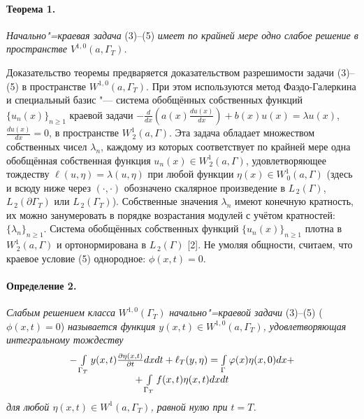 \paragraph{Теорема 1.} \emph{Начально"=краевая задача} (3)--(5) \emph{имеет по крайней мере одно слабое  решение в пространстве $V^{1,0}(a,\Gamma_{T})$.}

Доказательство теоремы предваряется доказательством разрешимости задачи (3)--(5) в пространстве $W^{1,0}(a,\Gamma_{T})$. При этом используются метод Фаэдо-Галеркина и специальный базис "--- система обобщённых собственных функций $\{u_n(x)\}_{n\geqslant 1}$ краевой задачи
$-\frac{d}{dx}\left(a(x)\frac{du(x)}{dx}\right)+b(x)u(x)=\lambda u(x)$, $\frac{du(x)}{dx}=0$,
в пространстве $W^1_{\,2}(a,\Gamma)$. Эта задача обладает множеством собственных чисел $\lambda_n$, каждому из которых соответствует по крайней мере одна обобщённая собственная функция $u_n(x)\in W^1_{\,2}(a,\Gamma)$, удовлетворяющее тождеству $\ell(u,\eta)=\lambda(u,\eta)$
при любой функции $\eta(x)\in W^1_{\,0}(a,\Gamma)$ (здесь и всюду ниже через $\left(\cdot,\cdot\right)$ обозначено скалярное произведение в $L_{\,2}(\Gamma)$, $L_{\,2}(\partial\Gamma_T)$ или $L_{\,2}(\Gamma_T)$). Собственные значения $\lambda_n$  имеют конечную кратность, их можно занумеровать в порядке возрастания модулей с учётом кратностей: $\{\lambda_n\}_{n\geqslant 1}$. Система обобщённых собственных функций $\{u_n(x)\}_{n\geqslant 1}$ плотна в $W_{\,2}^{1}(a,\Gamma)$ и ортонормирована в $L_{\,2}(\Gamma)$ [2].
Не умоляя общности, считаем, что краевое условие (5) однородное: $\phi(x,t)=0$.





\paragraph{Определение 2.} \emph{Слабым решением класса} $W^{1,0}(\Gamma_{T})$ \emph{начально"=краевой задачи} (3)--(5) ($\phi(x,t)=0$) \emph{называется функция $y(x,t)\in W^{1,0}(a,\Gamma_{T})$, удовлетворяющая интегральному тождеству}
\begin{equation}\label{eq8}
{{\begin{array}{*{20}c}
-\int\limits_{\Gamma_{T}}y(x,t)\frac{\partial \eta(x,t)}{\partial t}dxdt+\ell_T(y,\eta)=
\int\limits_{\Gamma}{\varphi}(x)\eta(x,0)dx+\\
+\int\limits_{\Gamma_{T}}{f}(x,t)\eta(x,t) dxdt
 \end{array} }}
\end{equation}
\emph{для любой $\eta(x,t)\in W^{1}(a,\Gamma_{T})$, равной нулю при $t=T$.}




